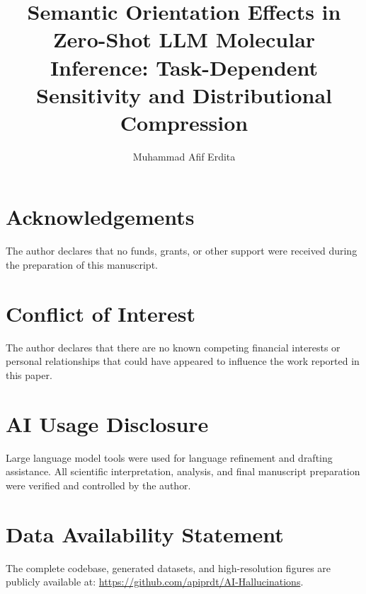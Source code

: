 \documentclass[AMA,STIX1COL]{WileyNJDv5}
\begin{document}
\title{Semantic Orientation Effects in Zero-Shot LLM Molecular Inference: Task-Dependent Sensitivity and Distributional Compression}

\author[1]{Muhammad Afif Erdita}


\address[1]{, , }


\abstract[Abstract]{

}


\maketitle









\section*{Acknowledgements}
The author declares that no funds, grants, or other support were received during the preparation of this manuscript.

\section*{Conflict of Interest}
The author declares that there are no known competing financial interests or personal relationships that could have appeared to influence the work reported in this paper.

\section*{AI Usage Disclosure}
Large language model tools were used for language refinement and drafting assistance. All scientific interpretation, analysis, and final manuscript preparation were verified and controlled by the author.

\section*{Data Availability Statement}
The complete codebase, generated datasets, and high-resolution figures are publicly available at: \url{https://github.com/apiprdt/AI-Hallucinations}.


\clearpage
\appendix

\end{document}
